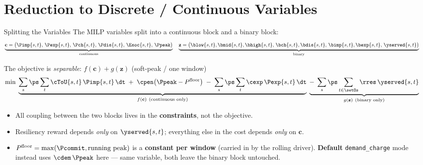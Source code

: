 %
%

\section{Reduction to Discrete / Continuous Variables}

\begin{frame}{Splitting the Variables}
The MILP variables split into a continuous block and a binary block:
\[
\underbrace{\mathbf{c}=\bigl(\Pimp{s,t},\,\Pexp{s,t},\,\Pch{s,t},\,\Pdis{s,t},\,\Esoc{s,t},\,\Ppeak\bigr)}_{\text{continuous}}
\quad
\underbrace{\mathbf{z}=\bigl(\blow{s,t},\bmid{s,t},\bhigh{s,t},\,\bch{s,t},\bdis{s,t},\,\bimp{s,t},\bexp{s,t},\,\yserved{s,t}\bigr)}_{\text{binary}}
\]
\begin{block}{The objective is \emph{separable}: $f(\mathbf c) + g(\mathbf z)$ (soft-peak / one window)}
\small
\[
\min\;
\underbrace{\sum_{s}\ps\sum_{t}\cToU{s,t}\,\Pimp{s,t}\,\dt
\;+\;\cpen\bigl(\Ppeak-P^{\text{floor}}\bigr)
\;-\;\sum_{s}\ps\sum_{t}\cexp\,\Pexp{s,t}\,\dt}_{f(\mathbf c)\ \text{(continuous only)}}
\;\underbrace{-\;\sum_{s}\ps\sum_{t\in\setOs}\rres\,\yserved{s,t}}_{g(\mathbf z)\ \text{(binary only)}}
\]
\end{block}
\begin{itemize}\footnotesize
  \item All coupling between the two blocks lives in the \textbf{constraints}, not the objective.
  \item Resiliency reward depends \emph{only} on $\yserved{s,t}$; everything else in the cost depends \emph{only} on $\mathbf c$.
  \item $P^{\text{floor}}=\max(\Pcommit,\text{running peak})$ is a \textbf{constant per window} (carried in by the rolling driver). \textbf{Default} \texttt{demand\_charge} mode instead uses $\cdem\,\Ppeak$ here — same variable, both leave the binary block untouched.
\end{itemize}
\end{frame}


